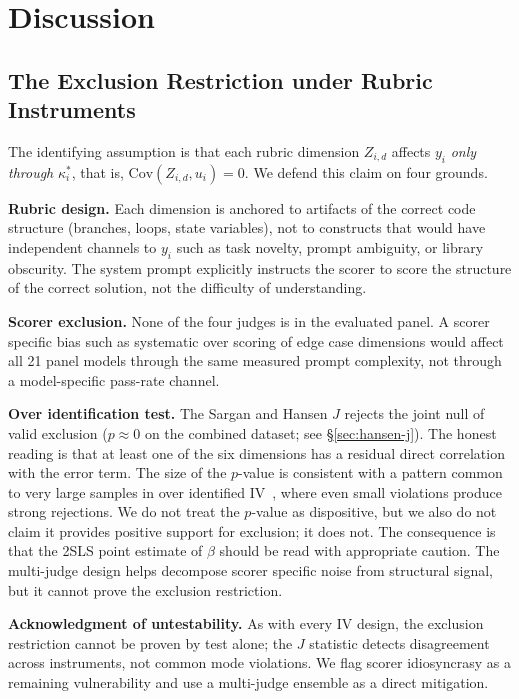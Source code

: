 \documentclass{article}
\begin{document}
\section{Discussion}

\subsection{The Exclusion Restriction under Rubric Instruments}

The identifying assumption is that each rubric dimension $Z_{i,d}$ affects $y_i$ \emph{only through} $\kappa_i^*$, that is, $\mathrm{Cov}(Z_{i,d}, u_i)=0$. We defend this claim on four grounds.

\textbf{Rubric design.} Each dimension is anchored to artifacts of the correct code structure (branches, loops, state variables), not to constructs that would have independent channels to $y_i$ such as task novelty, prompt ambiguity, or library obscurity. The system prompt explicitly instructs the scorer to score the structure of the correct solution, not the difficulty of understanding.

\textbf{Scorer exclusion.} None of the four judges is in the evaluated panel. A scorer specific bias such as systematic over scoring of edge case dimensions would affect all 21 panel models through the same measured prompt complexity, not through a model-specific pass-rate channel.

\textbf{Over identification test.} The Sargan and Hansen $J$ rejects the joint null of valid exclusion ($p\approx 0$ on the combined dataset; see \S\ref{sec:hansen-j}). The honest reading is that at least one of the six dimensions has a residual direct correlation with the error term. The size of the $p$-value is consistent with a pattern common to very large samples in over identified IV~\cite{bowsher2002reject}, where even small violations produce strong rejections. We do not treat the $p$-value as dispositive, but we also do not claim it provides positive support for exclusion; it does not. The consequence is that the 2SLS point estimate of $\beta$ should be read with appropriate caution. The multi-judge design helps decompose scorer specific noise from structural signal, but it cannot prove the exclusion restriction.

\textbf{Acknowledgment of untestability.} As with every IV design, the exclusion restriction cannot be proven by test alone; the $J$ statistic detects disagreement across instruments, not common mode violations. We flag scorer idiosyncrasy as a remaining vulnerability and use a multi-judge ensemble as a direct mitigation.
\end{document}

